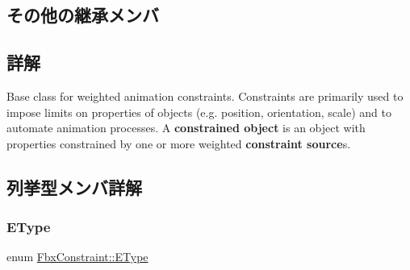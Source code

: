 \subsection*{その他の継承メンバ}


\subsection{詳解}
Base class for weighted animation constraints. Constraints are primarily used to impose limits on properties of objects (e.\+g. position, orientation, scale) and to automate animation processes. A {\bfseries constrained object} is an object with properties constrained by one or more weighted {\bfseries constraint source}s. 

\subsection{列挙型メンバ詳解}
\mbox{\label{class_fbx_constraint_a49c1634663395eab7c28856df233ec66}} 
\subsubsection{\texorpdfstring{E\+Type}{EType}}
{\footnotesize\ttfamily enum \hyperlink{class_fbx_constraint_a49c1634663395eab7c28856df233ec66}{Fbx\+Constraint\+::\+E\+Type}}

